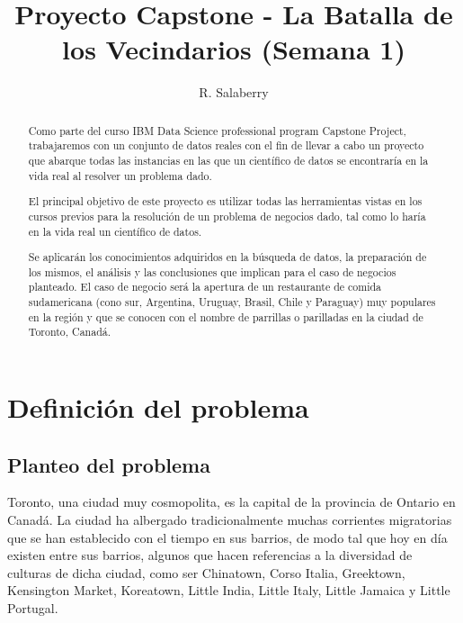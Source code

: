\documentclass[10pt,a4paper,arial, spanish]{article}
\title{Proyecto Capstone - La Batalla de los Vecindarios (Semana 1)}
\author{R. Salaberry}
\begin{document}
\maketitle

\begin{abstract}
	Como parte del curso IBM Data Science professional program Capstone Project, trabajaremos con un conjunto de datos reales con el fin de llevar a cabo un proyecto que abarque todas las instancias en las que un científico de datos se encontraría en la vida real al resolver un problema dado.
	
	El principal objetivo de este proyecto es utilizar todas las herramientas vistas en los cursos previos para la resolución de un problema de negocios dado, tal como lo haría en la vida real un científico de datos. 
	
	Se aplicarán los conocimientos adquiridos en la búsqueda de datos, la preparación de los mismos, el análisis y las conclusiones que implican para el caso de negocios planteado.
	El caso de negocio será la apertura de un restaurante de comida sudamericana (cono sur, Argentina, Uruguay, Brasil, Chile y Paraguay) muy populares en la región y que se conocen con el nombre de parrillas o parilladas en la ciudad de Toronto, Canadá. 
	 
	
\end{abstract}


\tableofcontents
\section{Definición del problema}
\subsection{Planteo del problema}
Toronto, una ciudad muy cosmopolita,  es la capital de la provincia de Ontario en Canadá. La ciudad ha albergado tradicionalmente muchas corrientes migratorias que se han establecido con el tiempo en sus barrios, de modo tal que hoy en día existen entre sus barrios, algunos que hacen referencias a la diversidad de culturas de dicha ciudad, como ser Chinatown, Corso Italia, Greektown, Kensington Market, Koreatown, Little India, Little Italy, Little Jamaica y Little Portugal.

\end{document}
